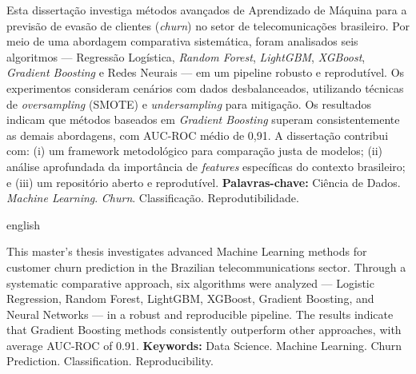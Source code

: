 \documentclass[
    12pt,
    oneside,
    a4paper,
    english,
    brazilian
    ]{abntex2}
\numberwithin{equation}{chapter}
\begin{document}
\pretextual
\maketitle
\newpage

\begin{resumo}
\noindent Esta dissertação investiga métodos avançados de Aprendizado de Máquina para a previsão de evasão de clientes (\textit{churn}) no setor de telecomunicações brasileiro. Por meio de uma abordagem comparativa sistemática, foram analisados seis algoritmos --- Regressão Logística, \textit{Random Forest}, \textit{LightGBM}, \textit{XGBoost}, \textit{Gradient Boosting} e Redes Neurais --- em um pipeline robusto e reprodutível. Os experimentos consideram cenários com dados desbalanceados, utilizando técnicas de \textit{oversampling} (SMOTE) e \textit{undersampling} para mitigação. Os resultados indicam que métodos baseados em \textit{Gradient Boosting} superam consistentemente as demais abordagens, com AUC-ROC médio de 0,91. A dissertação contribui com: (i) um framework metodológico para comparação justa de modelos; (ii) análise aprofundada da importância de \textit{features} específicas do contexto brasileiro; e (iii) um repositório aberto e reprodutível.
\newline
\noindent \textbf{Palavras-chave:} Ciência de Dados. \textit{Machine Learning}. \textit{Churn}. Classificação. Reprodutibilidade.
\end{resumo}

\begin{otherlanguage*}{english}
\begin{resumo}[Abstract]
\noindent This master's thesis investigates advanced Machine Learning methods for customer churn prediction in the Brazilian telecommunications sector. Through a systematic comparative approach, six algorithms were analyzed --- Logistic Regression, Random Forest, LightGBM, XGBoost, Gradient Boosting, and Neural Networks --- in a robust and reproducible pipeline. The results indicate that Gradient Boosting methods consistently outperform other approaches, with average AUC-ROC of 0.91.
\newline
\noindent \textbf{Keywords:} Data Science. Machine Learning. Churn Prediction. Classification. Reproducibility.
\end{resumo}
\end{otherlanguage*}
\newpage
\end{document}
